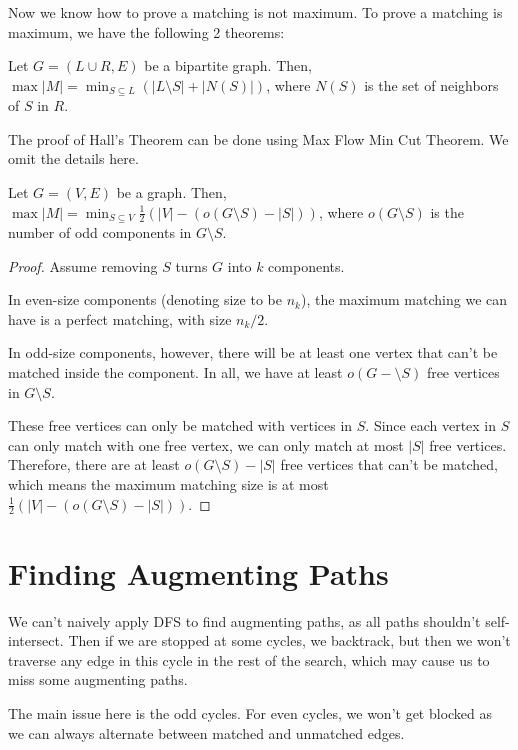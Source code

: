 Now we know how to prove a matching is not maximum. To prove a matching is maximum, we have the following 2 theorems:

\begin{theorem}
	Let $G = (L\cup R, E)$ be a bipartite graph. Then, $\max |M| = \min_{S\subseteq L} (|L\setminus S| + |N(S)|)$, where $N(S)$ is the set of neighbors of $S$ in $R$.
\end{theorem}
The proof of Hall's Theorem can be done using Max Flow Min Cut Theorem. We omit the details here.

\begin{theorem}
	Let $G = (V, E)$ be a graph. Then, $\max |M| = \min_{S\subseteq V} \frac{1}{2}(|V| - (o(G\setminus S)-|S|))$, where $o(G\setminus S)$ is the number of odd components in $G\setminus S$.
\end{theorem}

\begin{proof}
	Assume removing $S$ turns $G$ into $k$ components.

	In even-size components (denoting size to be $n_k$), the maximum matching we can have is a perfect matching, with size $n_k/2$.

	In odd-size components, however, there will be at least one vertex that can't be matched inside the component. In all, we have at least $o(G-\setminus S)$ free vertices in $G\setminus S$.

	These free vertices can only be matched with vertices in $S$. Since each vertex in $S$ can only match with one free vertex, we can only match at most $|S|$ free vertices. Therefore, there are at least $o(G\setminus S) - |S|$ free vertices that can't be matched, which means the maximum matching size is at most $\frac{1}{2}(|V| - (o(G\setminus S)-|S|))$.
\end{proof}

\section{Finding Augmenting Paths}

We can't naively apply DFS to find augmenting paths, as all paths shouldn't self-intersect. Then if we are stopped at some cycles, we backtrack, but then we won't traverse any edge in this cycle in the rest of the search, which may cause us to miss some augmenting paths.

The main issue here is the odd cycles. For even cycles, we won't get blocked as we can always alternate between matched and unmatched edges.

